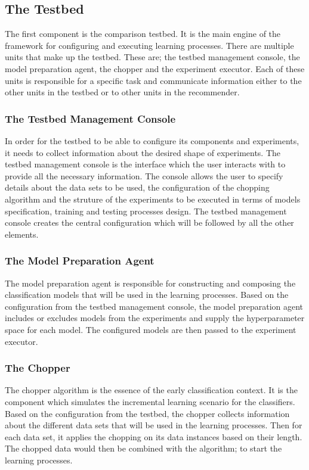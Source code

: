 \subsection{The Testbed}
\label{SubsectionTestbed}
The first component is the comparison testbed. It is the main engine of the framework for configuring and executing learning processes.
There are multiple units that make up the testbed. These are; the testbed management console, the model preparation agent, the chopper and the experiment executor.
Each of these units is responsible for a specific task and communicate information either to the other units in the testbed or to other units in the recommender.

\subsubsection*{The Testbed Management Console}
\label{TestbedManagementConsole}
In order for the testbed to be able to configure its components and experiments, it needs to collect information about the desired shape of experiments.
The testbed management console is the interface which the user interacts with to provide all the necessary information.
The console allows the user to specify details about the data sets to be used, the configuration of the chopping algorithm
and the struture of the experiments to be executed in terms of models specification, training and testing processes design.
The testbed management console creates the central configuration which will be followed by all the other elements.

\subsubsection*{The Model Preparation Agent}
\label{ModelPreparationAgent}
The model preparation agent is responsible for constructing and composing the classification models that will be used in the learning processes.
Based on the configuration from the testbed management console, the model preparation agent includes or excludes models from the experiments
and supply the hyperparameter space for each model. The configured models are then passed to the experiment executor.

\subsubsection*{The Chopper}
\label{Chopper}
The chopper algorithm is the essence of the early classification context. It is the component which simulates the incremental learning scenario for the classifiers.
Based on the configuration from the testbed, the chopper collects information about the different data sets that will be used in the learning processes.
Then for each data set, it applies the chopping on its data instances based on their length.
The chopped data would then be combined with the algorithm; to start the learning processes.


